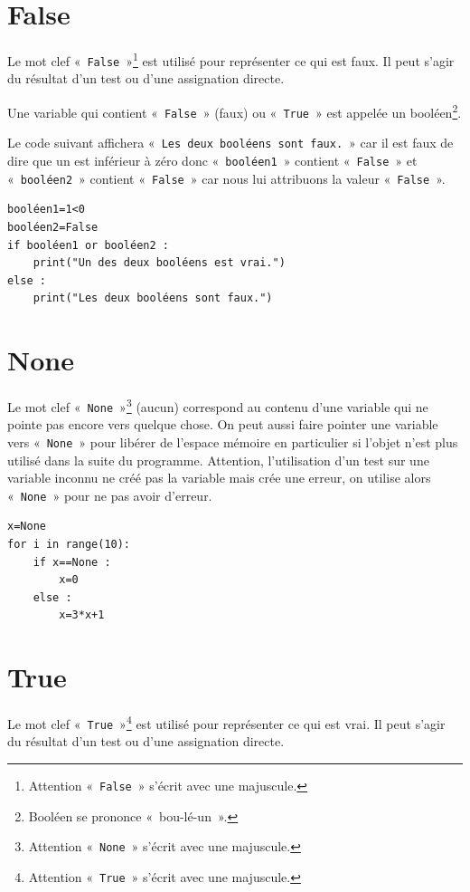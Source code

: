 \section*{False}
Le mot clef «~\texttt{False}~»\footnote{Attention «~\texttt{False}~» s'écrit avec une majuscule.} est utilisé pour représenter ce qui est faux. Il peut s'agir du résultat d'un test ou d'une assignation directe.

Une variable qui contient «~\texttt{False}~» (faux) ou «~\texttt{True}~» est appelée un booléen\footnote{Booléen se prononce «~bou-lé-un~».}.  

Le code suivant affichera «~\texttt{Les deux booléens sont faux.}~» car il est faux de dire que un est inférieur à zéro donc «~\texttt{booléen1}~» contient «~\texttt{False}~» et «~\texttt{booléen2}~» contient «~\texttt{False}~» car nous lui attribuons la valeur «~\texttt{False}~».
  
\begin{Verbatim}[frame=single,rulecolor=\color{gray}]
booléen1=1<0
booléen2=False
if booléen1 or booléen2 :
    print("Un des deux booléens est vrai.")
else :
	print("Les deux booléens sont faux.")
\end{Verbatim}

\section*{None}
Le mot clef «~\texttt{None}~»\footnote{Attention «~\texttt{None}~» s'écrit avec une majuscule.} (aucun) correspond au contenu d'une variable qui ne pointe pas encore vers quelque chose. On peut aussi faire pointer une variable vers «~\texttt{None}~» pour libérer de l'espace mémoire en particulier si l'objet n'est plus utilisé dans la suite du programme. Attention, l'utilisation d'un test sur une variable inconnu ne créé pas la variable mais crée une erreur, on utilise alors «~\texttt{None}~» pour ne pas avoir d'erreur.


\begin{Verbatim}[frame=single,rulecolor=\color{gray}]
x=None
for i in range(10):
    if x==None :
        x=0
    else :
        x=3*x+1
\end{Verbatim}
 
\section*{True}
Le mot clef «~\texttt{True}~»\footnote{Attention «~\texttt{True}~» s'écrit avec une majuscule.} est utilisé pour représenter ce qui est vrai. Il peut s'agir du résultat d'un test ou d'une assignation directe.

